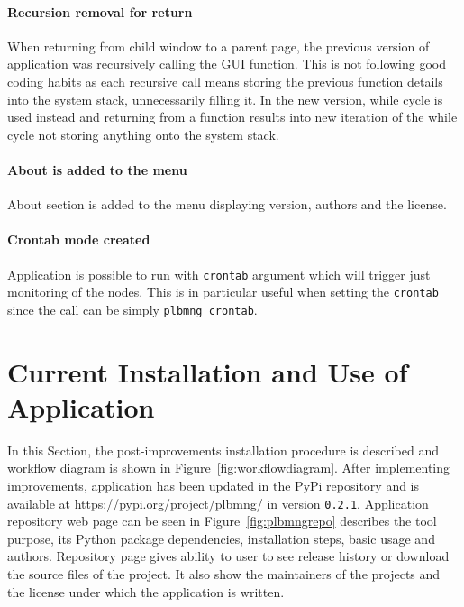 \paragraph{Recursion removal for return}
When returning from child window to a parent page, the previous version of application was recursively calling the GUI function. This is not following good coding habits as each recursive call means storing the previous function details into the system stack, unnecessarily filling it. In the new version, while cycle is used instead and returning from a function results into new iteration of the while cycle not storing anything onto the system stack. 
\paragraph{About is added to the menu}
About section is added to the menu displaying version, authors and the license.
\paragraph{Crontab mode created}
Application is possible to run with \texttt{crontab} argument which will trigger just monitoring of the nodes. This is in particular useful when setting the \texttt{crontab} since the call can be simply \texttt{plbmng crontab}. 

\section{Current Installation and Use of Application}
In this Section, the post-improvements installation procedure is described and workflow diagram is shown in Figure~\ref{fig:workflowdiagram}. After implementing improvements, application has been updated in the PyPi repository and is available at \url{https://pypi.org/project/plbmng/} in version \texttt{0.2.1}. Application repository web page can be seen in Figure~\ref{fig:plbmngrepo} describes the tool purpose, its Python package dependencies, installation steps, basic usage and authors. Repository page gives ability to user to see release history or download the source files of the project. It also show the maintainers of the projects and the license under which the application is written.

